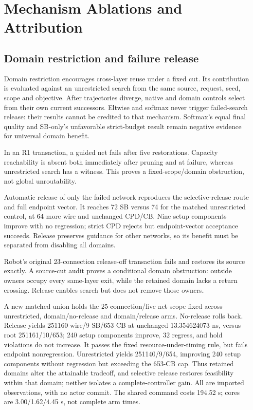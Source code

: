 \documentclass[conference,10pt]{IEEEtran}
\begin{document}
\section{Mechanism Ablations and Attribution}
\subsection{Domain restriction and failure release}
Domain restriction encourages cross-layer reuse under a fixed cut. Its contribution is evaluated against an unrestricted search from the same source, request, seed, scope and objective. After trajectories diverge, native and domain controls select from their own current successors. Eltwise and softmax never trigger failed-search release: their results cannot be credited to that mechanism. Softmax's equal final quality and SB-only's unfavorable strict-budget result remain negative evidence for universal domain benefit.

In an R1 transaction, a guided net fails after five restorations. Capacity reachability is absent both immediately after pruning and at failure, whereas unrestricted search has a witness. This proves a fixed-scope/domain obstruction, not global unroutability.

Automatic release of only the failed network reproduces the selective-release route and full endpoint vector. It reaches 72 SB versus 74 for the matched unrestricted control, at 64 more wire and unchanged CPD/CB. Nine setup components improve with no regression; strict CPD rejects but endpoint-vector acceptance succeeds. Release preserves guidance for other networks, so its benefit must be separated from disabling all domains.

Robot's original 23-connection release-off transaction fails and restores its source exactly. A source-cut audit proves a conditional domain obstruction: outside owners occupy every same-layer exit, while the retained domain lacks a return crossing. Release enables search but does not remove those owners.

A new matched union holds the 25-connection/five-net scope fixed across unrestricted, domain/no-release and domain/release arms. No-release rolls back. Release yields 251160 wire/9 SB/653 CB at unchanged 13.354624073 ns, versus root 251161/10/653; 240 setup components improve, 32 regress, and hold violations do not increase. It passes the fixed resource-under-timing rule, but fails endpoint nonregression. Unrestricted yields 251140/9/654, improving 240 setup components without regression but exceeding the 653-CB cap. Thus retained domains alter the attainable tradeoff, and selective release restores feasibility within that domain; neither isolates a complete-controller gain. All are imported observations, with no actor commit. The shared command costs 194.52 s; cores are 3.00/1.62/4.45 s, not complete arm times.
\end{document}
